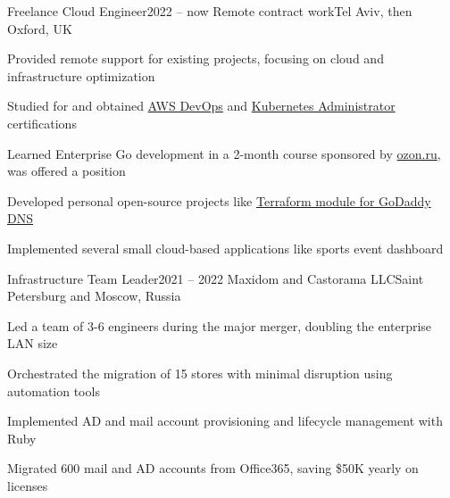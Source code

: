 


\expSubHeading
  {Freelance Cloud Engineer}{2022 -- now}
  {Remote contract work}{Tel Aviv, then Oxford, UK}
\begin{zitemize}
\item Provided remote support for existing projects, focusing on cloud and infrastructure optimization
\item Studied for and obtained \href{https://www.credly.com/badges/5b2e59d4-7b92-4512-a27f-3766fd520ad6}{AWS DevOps} and \href{https://www.credly.com/badges/35cd73fb-d95d-4f98-b7ce-caa6664475dc}{Kubernetes Administrator} certifications
\item Learned Enterprise Go development in a 2-month course sponsored by  \href{https://route256.ozon.ru/}{ozon.ru}, was offered a position
\item Developed personal open-source projects like \href{https://github.com/veksh/terraform-provider-godaddy-dns}{Terraform module for GoDaddy DNS}
\item Implemented several small cloud-based applications like sports event dashboard
\end{zitemize}

\expSubHeading
  {Infrastructure Team Leader}{2021 -- 2022}
  {Maxidom and Castorama LLC}{Saint Petersburg and Moscow, Russia}
\begin{zitemize}
\item Led a team of 3-6 engineers during the major merger, doubling the enterprise LAN size
\item Orchestrated the migration of 15 stores with minimal disruption using automation tools
\item Implemented AD and mail account provisioning and lifecycle management with Ruby
\item Migrated 600 mail and AD accounts from Office365, saving \$50K yearly on licenses
\end{zitemize}

